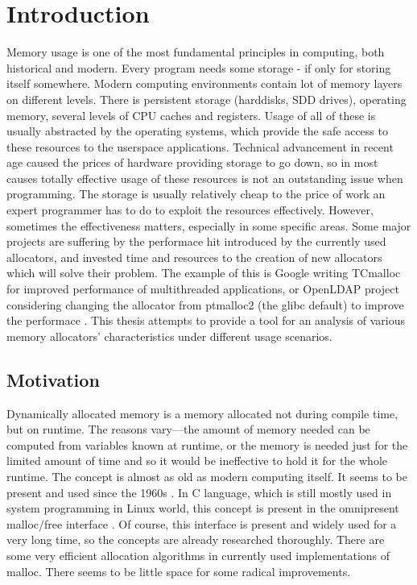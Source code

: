 
\chapter{Introduction}

Memory usage is one of the most fundamental principles in computing, both historical and modern. Every program needs some storage - if only for storing itself somewhere. Modern computing environments contain lot of memory layers on different levels. There is persistent storage (harddisks, SDD drives), operating memory, several levels of CPU caches and registers. Usage of all of these is usually abstracted by the operating systems, which provide the safe access to these resources to the userspace applications. Technical advancement in recent age caused the prices of hardware providing storage to go down, so in most causes totally effective usage of these resources is not an outstanding issue when programming. The storage is usually relatively cheap to the price of work an expert programmer has to do to exploit the resources effectively. However, sometimes the effectiveness matters, especially in some specific areas. Some major projects are suffering by the performace hit introduced by the currently used allocators, and invested time and resources to the creation of new allocators which will solve their problem. The example of this is Google writing TCmalloc for improved performance of multithreaded applications, or OpenLDAP project considering changing the allocator from ptmalloc2 (the glibc default) to improve the performace \cite{openldap-pres}. This thesis attempts to provide a tool for an analysis of various memory allocators' characteristics under different usage scenarios.

\section{Motivation}

Dynamically allocated memory is a memory allocated not during compile time, but on runtime. The reasons vary---the amount of memory needed can be computed from variables known at runtime, or the memory is needed just for the limited amount of time and so it would be ineffective to hold it for the whole runtime. The concept is almost as old as modern computing itself. It seems to be present and used since the 1960s \cite{DSAsurvey}. In C language, which is still mostly used in system programming in Linux world, this concept is present in the omnipresent malloc/free interface \cite{glibc-man-malloc}. Of course, this interface is present and widely used for a very long time, so the concepts are already researched thoroughly. There are some very efficient allocation algorithms in currently used implementations of malloc. There seems to be little space for some radical improvements.

